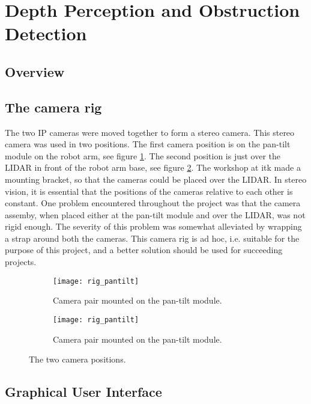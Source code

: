 \section{Depth Perception and Obstruction Detection}

\subsection{Overview}

\subsection{The camera rig}

The two IP cameras were moved together to form a stereo camera. This stereo camera was used in two positions. The first camera position is on the pan-tilt module on the robot arm, see figure \ref{fig:rig_pantilt}. The second position is just over the LIDAR in front of the robot arm base, see figure \ref{fig:rig_front}.  The workshop at \gls{itk} made a mounting bracket, so that the cameras could be placed over the LIDAR. In stereo vision, it is essential that the positions of the cameras relative to each other is constant. One problem encountered throughout the project was that the camera assemby, when placed either at the pan-tilt module and over the LIDAR, was not rigid enough. The severity of this problem was somewhat alleviated by wrapping a strap around both the cameras. This camera rig is ad hoc, i.e. suitable for the purpose of this project, and a better solution should be used for succeeding projects.

\begin{figure}
	\centering
	\begin{subfigure}[b]{0.45\textwidth}
		\texttt{[image: rig\_pantilt]}
		\caption{Camera pair mounted on the pan-tilt module.}
		\label{fig:rig_pantilt}
	\end{subfigure}
	\begin{subfigure}[b]{0.45\textwidth}
		\texttt{[image: rig\_pantilt]}
		\caption{Camera pair mounted on the pan-tilt module.}
		\label{fig:rig_front}
	\end{subfigure}
	\caption{\label{fig:campos}The two camera positions.}
\end{figure}

\subsection{Graphical User Interface}

